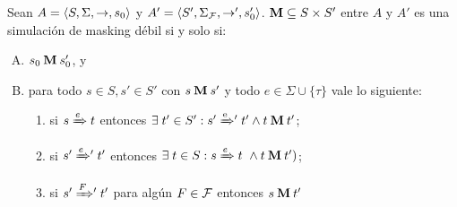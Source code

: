 \begin{theorem} \label{thm:weak_thm}
  Sean
$A =\langle S, \Sigma, \rightarrow, s_0 \rangle$ y $A' =\langle S', \Sigma_{\mathcal{F}}, \rightarrow', s'_0 \rangle$. 
$\mathbin{\mathbf{M}} \subseteq S \times S'$ entre $A$ y $A'$ es una simulación de masking débil si y solo si:

\begin{enumerate}[(A)]
  \item $s_0 \mathbin{\mathbf{M}} s'_0$, y
  \item para todo $s \in S, s' \in S'$ con $s \mathbin{\mathbf{M}} s'$ y todo $e \in \Sigma \cup \{\tau\}$ vale lo siguiente:

  \begin{enumerate}[(1)]
    \item si $s \xRightarrow{e} t$ entonces $\exists\; t' \in S': s' \mathrel{{\xRightarrow[]{\text{e}}}{}'} t' 
    \wedge t \mathbin{\mathbf{M}} t'$;

      \item si $s' \mathrel{{\xRightarrow[]{e}}{}'} t'$ entonces 
      $\exists \; t \in S: s \xRightarrow{e} t \
      \wedge t \mathbin{\mathbf{M}} t')$;

      \item si $s' \mathrel{{\xRightarrow[]{F}}{}'} t'$ para algún $F \in \mathcal{F}$ entonces 
      $s \mathbin{\mathbf{M}} t'$
  \end{enumerate}
\end{enumerate}

\end{theorem}

